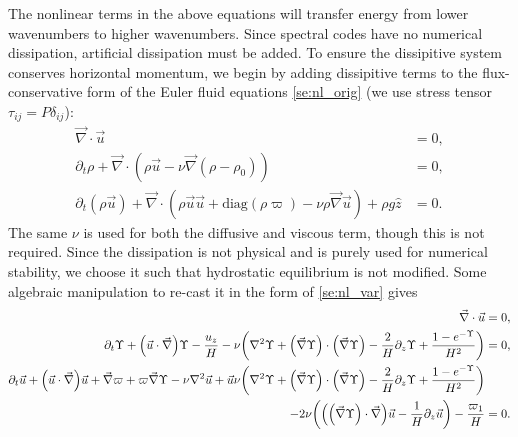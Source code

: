 \documentclass[twocolumn,
        nofootinbib, %
        usenames, %
        aps,
        prd,
        dvipsnames %
    ]{revtex4-1}%
\DeclarePairedDelimiter\p{\lparen}{\rparen}
\begin{document}
The nonlinear terms in the above equations will transfer energy from lower
wavenumbers to higher wavenumbers. Since spectral codes have no numerical
dissipation, artificial dissipation must be added. To ensure the dissipitive
system conserves horizontal momentum, we begin by adding dissipitive terms to
the flux-conservative form of the Euler fluid equations \autoref{se:nl_orig} (we
use stress tensor $\tau_{ij} = P\delta_{ij}$):
\begin{subequations}
    \begin{align}
        \vec{\nabla} \cdot \vec{u} &= 0,\\
        \partial_t \rho + \vec{\nabla} \cdot (\rho \vec{u} - \nu
            \vec{\nabla}(\rho - \rho_0)) &= 0,\label{eq:visc_cons_mom}\\
        \partial_t (\rho \vec{u}) + \vec{\nabla} \cdot (\rho \vec{u} \vec{u} +
            \mathrm{diag}(\rho \varpi) - \nu \rho \vec{\nabla}\vec{u}) + \rho g
            \hat{z} &= 0.
    \end{align}
\end{subequations}
The same $\nu$ is used for both the diffusive and viscous term, though this is
not required. Since the dissipation is not physical and is purely used for
numerical stability, we choose it such that hydrostatic equilibrium is not
modified. Some algebraic manipulation to re-cast it in the form of
\autoref{se:nl_var} gives
\begin{subequations}
    \begin{align}
        \vec{\nabla} \cdot \vec{u} &= 0,\\
        \partial_t \Upsilon + \p*{\vec{u} \cdot \vec{\nabla}} \Upsilon -
            \frac{u_z}{H} - \nu\p*{\nabla^2 \Upsilon + \p*{\vec{\nabla}
            \Upsilon} \cdot \p*{\vec{\nabla}\Upsilon} - \frac{2}{H}\partial_z
            \Upsilon + \frac{1 - e^{-\Upsilon}}{H^2}} &= 0,\\
        \partial_t \vec{u} + \p*{\vec{u} \cdot \vec{\nabla}}\vec{u} +
            \vec{\nabla} \varpi + \varpi \vec{\nabla} \Upsilon - \nu \nabla^2
            \vec{u} + \vec{u} \nu\p*{\nabla^2 \Upsilon + \p*{\vec{\nabla}
            \Upsilon} \cdot \p*{\vec{\nabla}\Upsilon} - \frac{2}{H}\partial_z
            \Upsilon + \frac{1 - e^{-\Upsilon}}{H^2}}&{}\nonumber\\
        - 2\nu \p*{\p*{\p*{\vec{\nabla}\Upsilon} \cdot \vec{\nabla}}\vec{u} -
            \frac{1}{H}\partial_z \vec{u}} - \frac{\varpi_1}{H} &= 0.
    \end{align}
\end{subequations}
\end{document}
